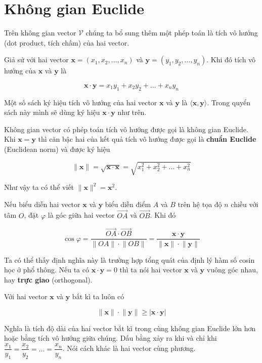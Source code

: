 \section{Không gian Euclide}

Trên không gian vector $\mathcal{V}$ chúng ta bổ sung thêm một phép toán là tích vô hướng (dot product, tích chấm) của hai vector.

Giả sử với hai vector $\bm{x} = (x_1, x_2, \ldots, x_n)$ và $\bm{y} = (y_1, y_2, \ldots, y_n)$. Khi đó tích vô hướng của $\bm{x}$ và $\bm{y}$ là

\begin{equation}
	\bm{x} \cdot \bm{y} = x_1 y_1 + x_2 y_2 + \ldots + x_n y_n
\end{equation}

Một số sách ký hiệu tích vô hướng của hai vector $\bm{x}$ và $\bm{y}$ là $\langle \bm{x}, \bm{y} \rangle$. Trong quyển sách này mình sẽ dùng ký hiệu $\bm{x} \cdot \bm{y}$ như trên.

Không gian vector có phép toán tích vô hướng được gọi là không gian Euclide. Khi $\bm{x} = \bm{y}$ thì căn bậc hai của kết quả tích vô hướng được gọi là \textbf{chuẩn Euclide} (Euclidean norm) và được ký hiệu

\begin{equation}
	\lVert \bm{x} \rVert = \sqrt{\bm{x} \cdot \bm{x}} = \sqrt{x_1^2 + x_2^2 + \ldots + x_n^2}
\end{equation}

Như vậy ta có thể viết $\lVert \bm{x} \rVert^2 = \bm{x}^2$.

Nếu biểu diễn hai vector $\bm{x}$ và $\bm{y}$ biểu diễn điểm $A$ và $B$ trên hệ tọa độ $n$ chiều với tâm $O$, đặt $\varphi$ là góc giữa hai vector $\overrightarrow{OA}$ và $\overrightarrow{OB}$. Khi đó 

\begin{equation}
	\cos \varphi = \frac{\overrightarrow{OA} \cdot \overrightarrow{OB}}{\lVert OA \rVert \cdot \lVert OB \rVert} = \frac{\bm{x} \cdot \bm{y}}{\lVert \bm{x} \rVert \cdot \lVert \bm{y} \rVert}
\end{equation}

Ta có thể thấy định nghĩa này là trường hợp tổng quát của định lý hàm số cosin học ở phổ thông. Nếu ta có $\bm{x} \cdot \bm{y} = 0$ thì ta nói hai vector $\bm{x}$ và $\bm{y}$ vuông góc nhau, hay \textbf{trực giao} (orthogonal).

\begin{theorem}
	Với hai vector $\bm{x}$ và $\bm{y}$ bất kì ta luôn có
	
	\begin{equation}
		\lVert \bm{x} \rVert \cdot \lVert \bm{y} \rVert \geq \lvert \bm{x} \cdot \bm{y} \rvert
	\end{equation}
	
	Nghĩa là tích độ dài của hai vector bất kì trong cùng không gian Euclide lớn hơn hoặc bằng tích vô hướng giữa chúng. Dấu bằng xảy ra khi và chỉ khi $\dfrac{x_1}{y_1} = \dfrac{x_2}{y_2} = \ldots = \dfrac{x_n}{y_n}$. Nói cách khác là hai vector cùng phương.
\end{theorem}

